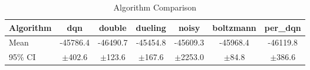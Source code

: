 \begin{table}[htbp]
\centering
\caption{Algorithm Comparison}
\label{tab:algorithm_comparison}
\begin{tabular}{lcccccc}
\toprule
Algorithm & dqn & double & dueling & noisy & boltzmann & per_dqn \\
\midrule
Mean  & -45786.4 & -46490.7 & -45454.8 & -45609.3 & -45968.4 & -46119.8 \\
95\% CI  & $\pm$402.6 & $\pm$123.6 & $\pm$167.6 & $\pm$2253.0 & $\pm$84.8 & $\pm$386.6 \\
\bottomrule
\end{tabular}
\end{table}
